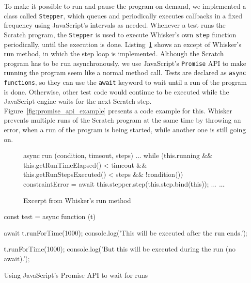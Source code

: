 To make it possible to run and pause the program on demand, we implemented a class called \texttt{Stepper},
which queues and periodically executes callbacks in a fixed frequency using JavaScript's intervals as needed.
Whenever a test runs the Scratch program,
the \texttt{Stepper} is used to execute Whisker's own \texttt{step} function periodically,
until the execution is done.
Listing~\ref{fig:run_method_excerpt} shows an except of Whisker's run method,
in which the step loop is implemented.
Although the Scratch program has to be run asynchronously, we use JavaScript's \texttt{Promise} API to make running the program seem like a normal method call.
Tests are declared as \texttt{async functions}, so they can use the \texttt{await} keyword to wait until a run of the program is done.
Otherwise, other test code would continue to be executed while the JavaScript engine waits for the next Scratch step.
Figure~\ref{fig:promise_api_example} presents a code example for this.
Whisker prevents multiple runs of the Scratch program at the same time by throwing an error,
when a run of the program is being started, while another one is still going on.
\parspace

\begin{figure}[htpb]
    \centering

    \begin{minipage}{.9\textwidth}
        \begin{javascriptcode}
            async run (condition, timeout, steps) {
                ...
                while (this.running &&
                       this.getRunTimeElapsed() < timeout &&
                       this.getRunStepsExecuted() < steps &&
                       !condition()) {
                    constraintError = await this.stepper.step(this.step.bind(this));
                    ...
                }
                ...
            }
        \end{javascriptcode}
    \end{minipage}

    \caption{Excerpt from Whisker's run method}
    \label{fig:run_method_excerpt}
\end{figure}

\begin{listing}[htpb]
    \centering

    \begin{minipage}{.9\textwidth}
        \begin{javascriptcode}
            const test = async function (t) {
                await t.runForTime(1000);
                console.log('This will be executed after the run ends.');

                t.runForTime(1000);
                console.log('But this will be executed during the run (no await).');
            }
        \end{javascriptcode}
    \end{minipage}

    \caption{Using JavaScript's Promise API to wait for runs}
    \label{fig:promise_api_example}
\end{listing}

